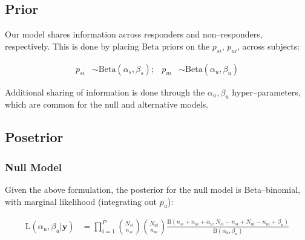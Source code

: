\documentclass[11pt]{article}
\begin{document}
\subsection{Prior}
Our model shares information across responders and non--responders, respectively. This is done by placing Beta priors on the $p_{si}$, $p_{ui}$, across subjects:
 
 \begin{align}
 p_{si} &\sim \mathrm{Beta}(\alpha_s,\beta_s);&
 p_{ui} &\sim \mathrm{Beta}(\alpha_u, \beta_u)\label{eq:prior}
 \end{align}

Additional sharing of information is done through the $\alpha_u, \beta_u$ hyper--parameters, which are common for the null and alternative models. 
\subsection{Posetrior}
\subsubsection{Null Model}
Given the above formulation, the posterior for the null model is Beta--binomial, with marginal likelihood (integrating out $p_u$):

 \begin{align}
  	\mathrm{L}(\alpha_u,\beta_u|\mathbf{y})
	&=\prod_{i=1}^P\binom{N_{si}}{n_{si}}\binom{N_{ui}}{n_{ui}}\frac{\mathrm{B}(n_{si}+n_{ui}+\alpha_u,N_{si}-n_{si}+N_{ui}-n_{ui}+\beta_u)}{\mathrm{B}(\alpha_u,\beta_u)}\label{eq:model1post}
 \end{align} 
\end{document}
